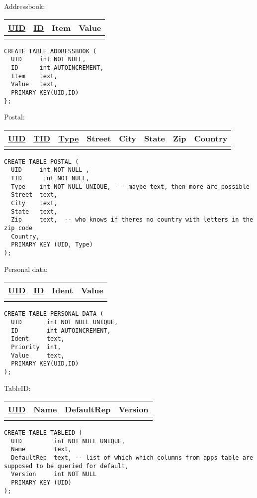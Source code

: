 \noindent
Addressbook: \\
\begin{tabular}[ht]{|l|l|l|l|}
\hline
\underline{UID} & \underline{ID} & Item & Value\\
\hline
 & & & \\
\hline
\end{tabular}

\begin{verbatim}
CREATE TABLE ADDRESSBOOK (
  UID     int NOT NULL,
  ID      int AUTOINCREMENT,
  Item    text,
  Value   text,
  PRIMARY KEY(UID,ID)
};
\end{verbatim} 
 

\noindent
Postal:\\
\begin{tabular}[ht]{|l|l|l|l|l|l|l|l|}
\hline
\underline{UID} & \underline{TID} & \underline{Type} & Street & City & State & Zip & Country  \\
\hline
 & & & & & & &\\
\hline
\end{tabular}
\begin{verbatim}
CREATE TABLE POSTAL (
  UID     int NOT NULL ,
  TID      int NOT NULL,
  Type    int NOT NULL UNIQUE,  -- maybe text, then more are possible
  Street  text,
  City    text,
  State   text,
  Zip     text,  -- who knows if theres no country with letters in the zip code
  Country,
  PRIMARY KEY (UID, Type)
);
\end{verbatim}
 

\noindent
Personal data: \\
\begin{tabular}[ht]{|l|l|l|l|}
\hline
\underline{UID} & \underline{ID} & Ident & Value \\
\hline
 & & & \\
\hline
\end{tabular}
\begin{verbatim}
CREATE TABLE PERSONAL_DATA (
  UID       int NOT NULL UNIQUE,
  ID        int AUTOINCREMENT,
  Ident     text,
  Priority  int,
  Value     text,
  PRIMARY KEY(UID,ID)
);      
\end{verbatim}

\noindent
TableID: \\
\begin{tabular}[ht]{|l|l|l|l|}
\hline
\underline{UID} & Name & DefaultRep & Version\\
\hline
 & & &\\
\hline
\end{tabular}
\begin{verbatim}
CREATE TABLE TABLEID (
  UID         int NOT NULL UNIQUE,
  Name        text,
  DefaultRep  text, -- list of which which columns from apps table are supposed to be queried for default,
  Version     int NOT NULL 
  PRIMARY KEY (UID)
);
\end{verbatim}



